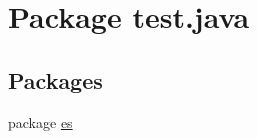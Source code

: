 \hypertarget{namespacetest_1_1java}{}\section{Package test.\+java}
\label{namespacetest_1_1java}
\subsection*{Packages}
\begin{DoxyCompactItemize}
\item 
package \hyperlink{namespacetest_1_1java_1_1es}{es}
\end{DoxyCompactItemize}
